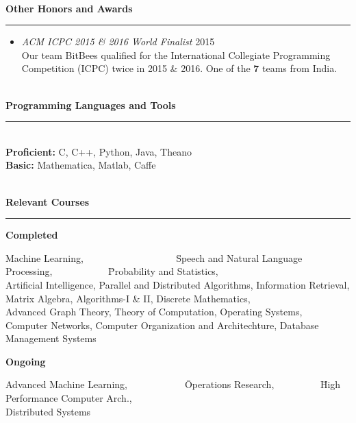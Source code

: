 \documentclass[a4paper,10pt,oneside]{article}
\newcommand{\heading}[1]{
 {\Large \textbf{#1}}
  \vspace{0.4em}
  \hrule
  \vspace{0.4em}
}
\newcommand{\SmallEntryGap}{ \vspace{0.6em} }
\newcommand{\EntryGap}{ ~\\ }
\begin{document}

\EntryGap
\heading{Other Honors and Awards}
\begin{itemize}
\item \emph{ACM ICPC 2015 \& 2016 World Finalist} \hfill 2015\\
Our team BitBees qualified for the International Collegiate Programming Competition (ICPC) twice in 2015 \& 2016. One of the \textbf{7} teams from India.
\end{itemize}



\EntryGap
\heading{Programming Languages and Tools}
\EntryGap
\textbf{Proficient:} C, C++, Python, Java, Theano\\
\textbf{Basic:} Mathematica, Matlab, Caffe



\EntryGap
\heading{Relevant Courses}
\SmallEntryGap
\textbf{Completed}
\begin{tabbing}
Machine Learning, ~~~~~~~~~~~~~~~~~~ \= Speech and Natural Language Processing, ~~~~~~~~~~~\= Probability and Statistics,\\
Artificial Intelligence, \> Parallel and Distributed Algorithms, \> Information Retrieval, \\
Matrix Algebra, \> Algorithms-I \& II, \> Discrete Mathematics,\\
Advanced Graph Theory, \> Theory of Computation, \> Operating Systems,\\
Computer Networks, \> Computer Organization and Architechture, \> Database Management Systems\\
\end{tabbing}

\SmallEntryGap
\textbf{Ongoing}\\
\begin{tabbing}
Advanced Machine Learning,~~~~~~~~~~~~\= Operations Research, ~~~~~~~~~\=High Performance Computer Arch.,\\
Distributed Systems
\end{tabbing}
\end{document}
